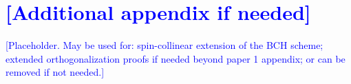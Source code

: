 \documentclass[journal=jctcce,manuscript=article,etalmode=truncate,maxauthors=10,layout=onecolumn]{achemso}
\newcommand{\myblue}[1]{\textcolor{blue}{#1}}
\begin{document}
\section{\myblue{[Additional appendix if needed]}}
\label{app:additional}

\myblue{[Placeholder. May be used for: spin-collinear extension of the
BCH scheme; extended orthogonalization proofs if needed beyond paper 1
appendix; or can be removed if not needed.]}
\fi

\balance

\balance
\end{document}
